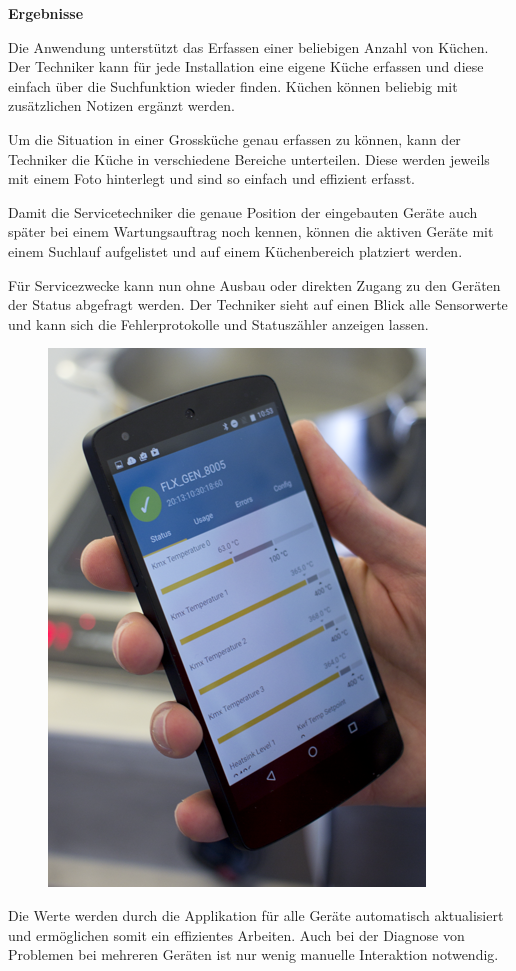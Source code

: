 \textbf{Ergebnisse}

Die Anwendung unterstützt das Erfassen einer beliebigen Anzahl von Küchen. Der Techniker kann für jede Installation eine eigene Küche erfassen und diese einfach über die Suchfunktion wieder finden. Küchen können beliebig mit zusätzlichen Notizen ergänzt werden.

Um die Situation in einer Grossküche genau erfassen zu können, kann der Techniker die Küche in verschiedene Bereiche unterteilen. Diese werden jeweils mit einem Foto hinterlegt und sind so einfach und effizient erfasst.

Damit die Servicetechniker die genaue Position der eingebauten Geräte auch später bei einem Wartungsauftrag noch kennen, können die aktiven Geräte mit einem Suchlauf aufgelistet und auf einem Küchenbereich platziert werden.

\WFclear

Für Servicezwecke kann nun ohne Ausbau oder direkten Zugang zu den Geräten der Status abgefragt werden. Der Techniker sieht auf einen Blick alle Sensorwerte und kann sich die Fehlerprotokolle und Statuszähler anzeigen lassen.

\begin{figure}
	\vspace{-.5cm}
	\begin{center}
		\includegraphics[scale=1]{start/img/img_7610}
	\end{center}
	\vspace{-1cm}
\end{figure}
Die Werte werden durch die Applikation für alle Geräte automatisch aktualisiert und ermöglichen somit ein effizientes Arbeiten. Auch bei der Diagnose von Problemen bei mehreren Geräten ist nur wenig manuelle Interaktion notwendig.

